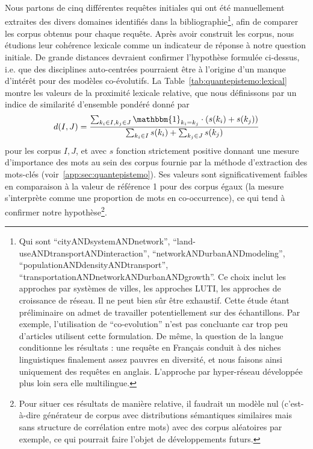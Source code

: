 {}{
Nous partons de cinq différentes requêtes initiales qui ont été manuellement extraites des divers domaines identifiés dans la bibliographie\footnote{Qui sont ``cityANDsystemANDnetwork'', ``land-useANDtransportANDinteraction'', ``networkANDurbanANDmodeling'', ``populationANDdensityANDtransport'', ``transportationANDnetworkANDurbanANDgrowth''. Ce choix inclut les approches par systèmes de villes, les approches LUTI, les approches de croissance de réseau. Il ne peut bien sûr être exhaustif. Cette étude étant préliminaire on admet de travailler potentiellement sur des échantillons. Par exemple, l'utilisation de ``co-evolution'' n'est pas concluante car trop peu d'articles utilisent cette formulation. De même, la question de la langue conditionne les résultats : une requête en Français conduit à des niches linguistiques finalement assez pauvres en diversité, et nous faisons ainsi uniquement des requêtes en anglais. L'approche par hyper-réseau développée plus loin sera elle multilingue.}, afin de comparer les corpus obtenus pour chaque requête. Après avoir construit les corpus, nous étudions leur cohérence lexicale comme un indicateur de réponse à notre question initiale. De grande distances devraient confirmer l'hypothèse formulée ci-dessus, i.e. que des disciplines auto-centrées pourraient être à l'origine d'un manque d'intérêt pour des modèles co-évolutifs. La Table~\ref{tab:quantepistemo:lexical} montre les valeurs de la proximité lexicale relative, que nous définissons par un indice de similarité d'ensemble pondéré donné par
\[
d(I,J) = \frac{\sum_{k_i \in I, k_j \in J} \mathbbm{1}_{k_i = k_j} \cdot (s(k_i) + s(k_j))}{\sum_{k_i \in I} s(k_i) + \sum_{k_j \in J} s(k_j)}
\]
pour les corpus $I,J$, et avec $s$ fonction strictement positive donnant une mesure d'importance des mots au sein des corpus fournie par la méthode d'extraction des mots-clés (voir~\ref{app:sec:quantepistemo}). Ses valeurs sont significativement faibles en comparaison à la valeur de référence 1 pour des corpus égaux (la mesure s'interprète comme une proportion de mots en co-occurrence), ce qui tend à confirmer notre hypothèse\footnote{Pour situer ces résultats de manière relative, il faudrait un modèle nul (c'est-à-dire générateur de corpus avec distributions sémantiques similaires mais sans structure de corrélation entre mots) avec des corpus aléatoires par exemple, ce qui pourrait faire l'objet de développements futurs.}.
}




